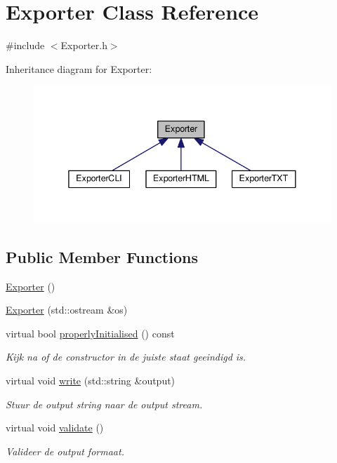 \hypertarget{class_exporter}{}\section{Exporter Class Reference}
\label{class_exporter}


{\ttfamily \#include $<$Exporter.\+h$>$}



Inheritance diagram for Exporter\+:
\nopagebreak
\begin{figure}[H]
\begin{center}
\leavevmode
\includegraphics[width=338pt]{class_exporter__inherit__graph}
\end{center}
\end{figure}
\subsection*{Public Member Functions}
\begin{DoxyCompactItemize}
\item 
\hyperlink{class_exporter_a2a977cb5ac8f637fcb570e73f650eca0}{Exporter} ()
\item 
\hyperlink{class_exporter_aa0dd651db7d938f6bc104c603937c6f2}{Exporter} (std\+::ostream \&os)
\item 
virtual bool \hyperlink{class_exporter_af01d2a6c2f54329b1867a19537e11a34}{properly\+Initialised} () const 
\begin{DoxyCompactList}\small\item\em Kijk na of de constructor in de juiste staat geeindigd is. \end{DoxyCompactList}\item 
virtual void \hyperlink{class_exporter_ac095b6486da16ffc76539f8c6c67be70}{write} (std\+::string \&output)
\begin{DoxyCompactList}\small\item\em Stuur de output string naar de output stream. \end{DoxyCompactList}\item 
virtual void \hyperlink{class_exporter_a190fe737bcda2a55707ae51b731d11a5}{validate} ()
\begin{DoxyCompactList}\small\item\em Valideer de output formaat. \end{DoxyCompactList}\end{DoxyCompactItemize}


